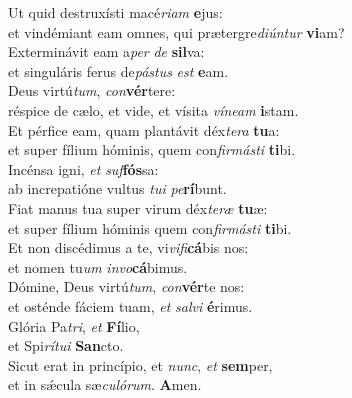 \oddverse Ut quid destruxísti macé\textit{ri}\textit{am} \textbf{e}jus:~\*\\
\oddverse et vindémiant eam omnes, qui prætergre\textit{di}\textit{ún}\textit{tur} \textbf{vi}am?\\
\evenverse Exterminávit eam a\textit{per} \textit{de} \textbf{sil}va:~\*\\
\evenverse et singuláris ferus de\textit{pá}\textit{stus} \textit{est} \textbf{e}am.\\
\oddverse Deus virtú\textit{tum}, \textit{con}\textbf{vér}tere:~\*\\
\oddverse réspice de cælo, et vide, et vísita \textit{ví}\textit{ne}\textit{am} \textbf{i}stam.\\
\evenverse Et pérfice eam, quam plantávit déx\textit{te}\textit{ra} \textbf{tu}a:~\*\\
\evenverse et super fílium hóminis, quem con\textit{fir}\textit{má}\textit{sti} \textbf{ti}bi.\\
\oddverse Incénsa igni, \textit{et} \textit{suf}\textbf{fós}sa:~\*\\
\oddverse ab increpatióne vultus \textit{tu}\textit{i} \textit{pe}\textbf{rí}bunt.\\
\evenverse Fiat manus tua super virum déx\textit{te}\textit{ræ} \textbf{tu}æ:~\*\\
\evenverse et super fílium hóminis quem con\textit{fir}\textit{má}\textit{sti} \textbf{ti}bi.\\
\oddverse Et non discédimus a te, vi\textit{vi}\textit{fi}\textbf{cá}bis nos:~\*\\
\oddverse et nomen tu\textit{um} \textit{in}\textit{vo}\textbf{cá}bimus.\\
\evenverse Dómine, Deus virtú\textit{tum}, \textit{con}\textbf{vér}te nos:~\*\\
\evenverse et osténde fáciem tuam, \textit{et} \textit{sal}\textit{vi} \textbf{é}rimus.\\
\oddverse Glória Pa\textit{tri}, \textit{et} \textbf{Fí}lio,~\*\\
\oddverse et Spi\textit{rí}\textit{tu}\textit{i} \textbf{San}cto.\\
\evenverse Sicut erat in princípio, et \textit{nunc}, \textit{et} \textbf{sem}per,~\*\\
\evenverse et in sǽcula sæ\textit{cu}\textit{ló}\textit{rum}. \textbf{A}men.\\
